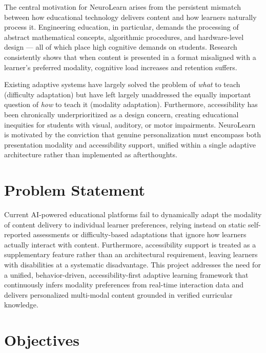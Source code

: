 The central motivation for NeuroLearn arises from the persistent mismatch between how educational technology delivers content and how learners naturally process it. Engineering education, in particular, demands the processing of abstract mathematical concepts, algorithmic procedures, and hardware-level design --- all of which place high cognitive demands on students. Research consistently shows that when content is presented in a format misaligned with a learner's preferred modality, cognitive load increases and retention suffers.

Existing adaptive systems have largely solved the problem of \textit{what} to teach (difficulty adaptation) but have left largely unaddressed the equally important question of \textit{how} to teach it (modality adaptation). Furthermore, accessibility has been chronically underprioritized as a design concern, creating educational inequities for students with visual, auditory, or motor impairments. NeuroLearn is motivated by the conviction that genuine personalization must encompass both presentation modality and accessibility support, unified within a single adaptive architecture rather than implemented as afterthoughts.

\section[Problem Statement]{\textbf{Problem Statement}}

Current AI-powered educational platforms fail to dynamically adapt the modality of content delivery to individual learner preferences, relying instead on static self-reported assessments or difficulty-based adaptations that ignore how learners actually interact with content. Furthermore, accessibility support is treated as a supplementary feature rather than an architectural requirement, leaving learners with disabilities at a systematic disadvantage. This project addresses the need for a unified, behavior-driven, accessibility-first adaptive learning framework that continuously infers modality preferences from real-time interaction data and delivers personalized multi-modal content grounded in verified curricular knowledge.

\section[Objectives]{\textbf{Objectives}}

